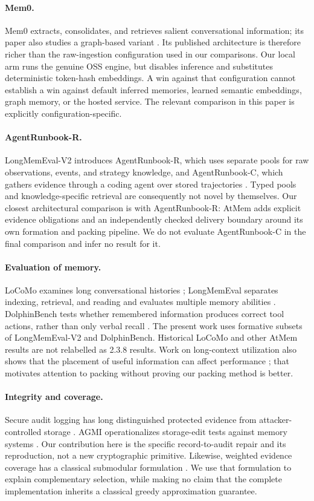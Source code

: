 \documentclass[10pt,twocolumn]{article}
\begin{document}
\paragraph{Mem0.}
Mem0 extracts, consolidates, and retrieves salient conversational information; its paper also studies a graph-based variant \citep{mem0}. Its published architecture is therefore richer than the raw-ingestion configuration used in our comparisons. Our local arm runs the genuine OSS engine, but disables inference and substitutes deterministic token-hash embeddings. A win against that configuration cannot establish a win against default inferred memories, learned semantic embeddings, graph memory, or the hosted service. The relevant comparison in this paper is explicitly configuration-specific.

\paragraph{AgentRunbook-R.}
LongMemEval-V2 introduces AgentRunbook-R, which uses separate pools for raw observations, events, and strategy knowledge, and AgentRunbook-C, which gathers evidence through a coding agent over stored trajectories \citep{lme2}. Typed pools and knowledge-specific retrieval are consequently not novel by themselves. Our closest architectural comparison is with AgentRunbook-R: AtMem adds explicit evidence obligations and an independently checked delivery boundary around its own formation and packing pipeline. We do not evaluate AgentRunbook-C in the final comparison and infer no result for it.

\paragraph{Evaluation of memory.}
LoCoMo examines long conversational histories \citep{locomo}; LongMemEval separates indexing, retrieval, and reading and evaluates multiple memory abilities \citep{lme}. DolphinBench tests whether remembered information produces correct tool actions, rather than only verbal recall \citep{dolphin}. The present work uses formative subsets of LongMemEval-V2 and DolphinBench. Historical LoCoMo and other AtMem results are not relabelled as 2.3.8 results. Work on long-context utilization also shows that the placement of useful information can affect performance \citep{lost}; that motivates attention to packing without proving our packing method is better.

\paragraph{Integrity and coverage.}
Secure audit logging has long distinguished protected evidence from attacker-controlled storage \citep{audit}. AGMI operationalizes storage-edit tests against memory systems \citep{agmi}. Our contribution here is the specific record-to-audit repair and its reproduction, not a new cryptographic primitive. Likewise, weighted evidence coverage has a classical submodular formulation \citep{submodular}. We use that formulation to explain complementary selection, while making no claim that the complete implementation inherits a classical greedy approximation guarantee.
\end{document}
